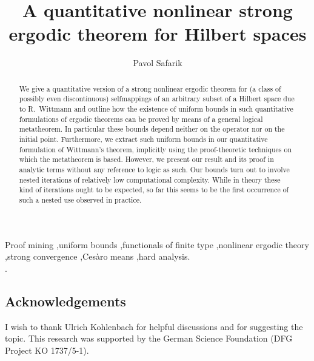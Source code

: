 \documentclass[1p]{elsarticle}
\theoremstyle{definition}
\begin{document}


\title{A quantitative nonlinear strong ergodic theorem for Hilbert spaces}
\author{Pavol Safarik}
\address{Department of Mathematics, Technische Universit\"at Darmstadt, Schlossgartenstra{\ss}e 7, 64289 Darmstadt, Germany}

\date{}

\begin{abstract}
We give a quantitative version of a strong nonlinear ergodic theorem for (a class of possibly even discontinuous) 
selfmappings of an arbitrary subset of a Hilbert space due to R.~Wittmann and 
outline how the existence of uniform bounds in such quantitative formulations of ergodic theorems
can be proved by means of a general logical metatheorem.
In particular these bounds depend neither on the operator nor on the initial point.
Furthermore, we extract such
uniform bounds in our quantitative formulation of Wittmann's theorem, implicitly using the 
proof-theoretic techniques on which the metatheorem is based. However, we present our result
and its proof in analytic terms without any reference to logic as such. Our bounds turn out to involve
nested iterations of relatively low computational complexity. While in theory these kind
of iterations ought to be expected, so far this seems to be the first occurrence
of such a nested use observed in practice. %
\end{abstract}

\begin{keyword}
Proof mining \sep uniform bounds \sep functionals of finite type \sep nonlinear ergodic theory \sep strong convergence \sep Ces{\`a}ro means \sep hard analysis.\\
.
\end{keyword}


\maketitle














\subsection*{Acknowledgements}
I wish to thank Ulrich Kohlenbach for helpful discussions and for suggesting the topic.
This research was supported by the German Science Foundation (DFG Project KO 1737/5-1). 


\end{document}
